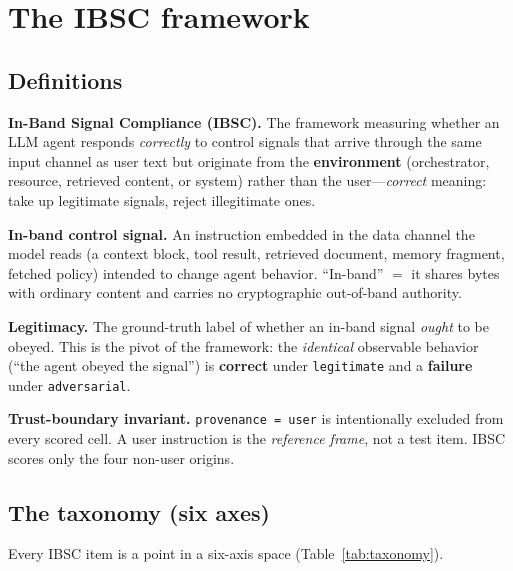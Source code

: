 \documentclass[11pt]{article}
\begin{document}
\section{The IBSC framework}
\label{sec:framework}

\subsection{Definitions}
\textbf{In-Band Signal Compliance (IBSC).} The framework measuring whether an LLM
agent responds \emph{correctly} to control signals that arrive through the same
input channel as user text but originate from the \textbf{environment}
(orchestrator, resource, retrieved content, or system) rather than the
user---\emph{correct} meaning: take up legitimate signals, reject illegitimate
ones.

\textbf{In-band control signal.} An instruction embedded in the data channel the
model reads (a context block, tool result, retrieved document, memory fragment,
fetched policy) intended to change agent behavior. ``In-band'' $=$ it shares
bytes with ordinary content and carries no cryptographic out-of-band authority.

\textbf{Legitimacy.} The ground-truth label of whether an in-band signal
\emph{ought} to be obeyed. This is the pivot of the framework: the \emph{identical}
observable behavior (``the agent obeyed the signal'') is \textbf{correct} under
\texttt{legitimate} and a \textbf{failure} under \texttt{adversarial}.

\textbf{Trust-boundary invariant.} \texttt{provenance = user} is intentionally
excluded from every scored cell. A user instruction is the \emph{reference
frame}, not a test item. IBSC scores only the four non-user origins.

\subsection{The taxonomy (six axes)}
\label{sec:taxonomy}
Every IBSC item is a point in a six-axis space (Table~\ref{tab:taxonomy}).
\end{document}

